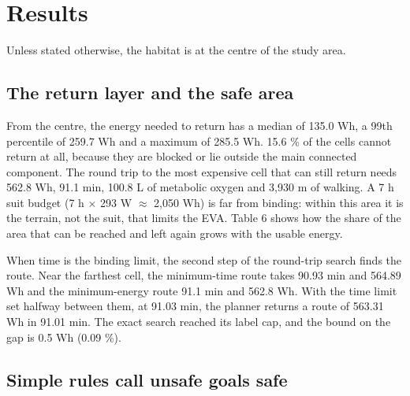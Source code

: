 \documentclass[11pt,a4paper]{article}
\begin{document}
\section{Results}

Unless stated otherwise, the habitat is at the centre of the study area.

\subsection{The return layer and the safe area}

From the centre, the energy needed to return has a median of 135.0 Wh, a 99th percentile of 259.7 Wh and a maximum of 285.5 Wh. 15.6 \% of the cells cannot return at all, because they are blocked or lie outside the main connected component. The round trip to the most expensive cell that can still return needs 562.8 Wh, 91.1 min, 100.8 L of metabolic oxygen and 3,930 m of walking. A 7 h suit budget (7 h $\times$ 293 W $\approx$ 2,050 Wh) is far from binding: within this area it is the terrain, not the suit, that limits the EVA. Table 6 shows how the share of the area that can be reached and left again grows with the usable energy.

\begin{table}[H]
\centering\small
\caption{\textbf{Table 6. Share of the grid that is reachable and returnable against the usable energy.}}
\end{table}

When time is the binding limit, the second step of the round-trip search finds the route. Near the farthest cell, the minimum-time route takes 90.93 min and 564.89 Wh and the minimum-energy route 91.1 min and 562.8 Wh. With the time limit set halfway between them, at 91.03 min, the planner returns a route of 563.31 Wh in 91.01 min. The exact search reached its label cap, and the bound on the gap is 0.5 Wh (0.09 \%).

\subsection{Simple rules call unsafe goals safe}
\end{document}
